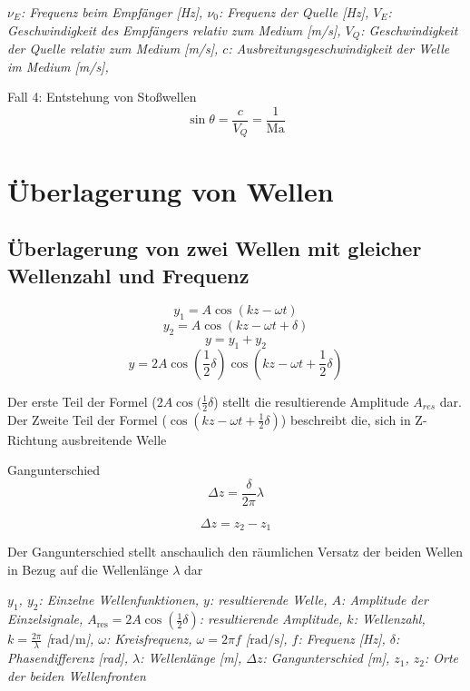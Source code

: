 \documentclass[a4paper,10pt]{article}
\newenvironment{displayformula}
{
	\begin{framed}
		\color{formulaColor}
	}
	{\end{framed}}
\newcommand{\formulalegend}[1]{%
	\par\vspace{0.5ex}%
	{{\color{legendColor}\RaggedRight\small\textit{#1}}}%
	\par\vspace{1.5ex}%
}
\begin{document}
\formulalegend{
	$\nu_E$: Frequenz beim Empfänger [Hz], 
	$\nu_0$: Frequenz der Quelle [Hz], 
	$V_E$: Geschwindigkeit des Empfängers relativ zum Medium [m/s], 
	$V_Q$: Geschwindigkeit der Quelle relativ zum Medium [m/s], 
	$c$: Ausbreitungsgeschwindigkeit der Welle im Medium [m/s], 
}

\begin{displayformula}
	Fall 4: Entstehung von Stoßwellen
	\[
	\sin \theta = \frac{c}{V_Q} = \frac{1}{\text{Ma}}
	\]
\end{displayformula}

\section{Überlagerung von Wellen}

\subsection{Überlagerung von zwei Wellen mit gleicher Wellenzahl und Frequenz}
\begin{displayformula}
\[
y_1 = A \cos (kz - \omega t)
\]
\[
y_2 = A \cos (kz - \omega t + \delta)
\]
\[
y = y_1 + y_2
\]
\[
y = 2 A \cos (\frac{1}{2} \delta) \cos (kz - \omega t + \frac{1}{2} \delta)
\]
\end{displayformula}
Der erste Teil der Formel ($2A \cos (\frac{1}{2} \delta$) stellt die resultierende Amplitude $A_{res}$ dar. \\
Der Zweite Teil der Formel ($\cos (kz - \omega t + \frac{1}{2} \delta)$) beschreibt die, sich in Z-Richtung ausbreitende Welle

\begin{displayformula}
	Gangunterschied
	\[
	\Delta z = \frac{\delta}{2 \pi} \lambda
	\]
	
	\[
	\Delta z = z_2 - z_1
	\]
\end{displayformula}
Der Gangunterschied stellt anschaulich den räumlichen Versatz der beiden Wellen in Bezug auf die Wellenlänge $\lambda$ dar
\formulalegend{
	$y_1$, $y_2$: Einzelne Wellenfunktionen, 
	$y$: resultierende Welle, 
	$A$: Amplitude der Einzelsignale, 
	$A_{\text{res}} = 2A \cos(\frac{1}{2}\delta)$: resultierende Amplitude, 
	$k$: Wellenzahl, $k = \frac{2\pi}{\lambda}$ [$\text{rad}/\text{m}$], 
	$\omega$: Kreisfrequenz, $\omega = 2\pi f$ [$\text{rad}/\text{s}$], 
	$f$: Frequenz [Hz], 
	$\delta$: Phasendifferenz [rad], 
	$\lambda$: Wellenlänge [m], 
	$\Delta z$: Gangunterschied [m], 
	$z_1$, $z_2$: Orte der beiden Wellenfronten
}
\end{document}
